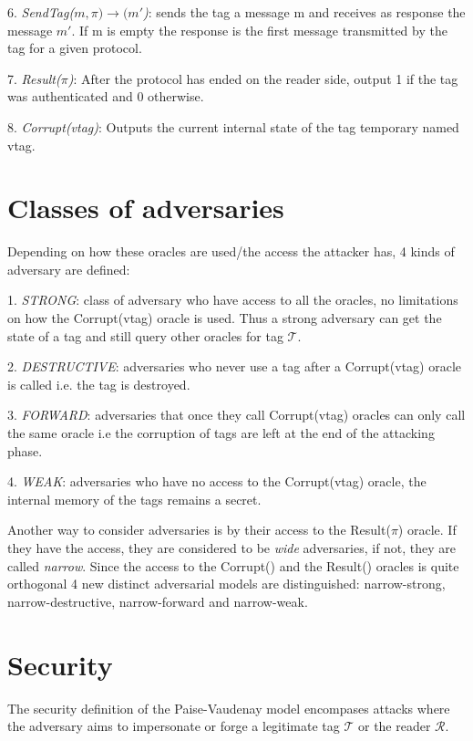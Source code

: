     6. \textit{SendTag($m, \pi) \rightarrow (m'$)}: sends the tag a message m and receives as response 
    the message $m'$. If m is empty the response is the first message transmitted by the tag for
    a given protocol. 

    7. \textit{Result($\pi$)}: After the protocol has ended on the reader side, output 1 if the tag was 
    authenticated and 0 otherwise.

    8. \textit{Corrupt(vtag)}: Outputs the current internal state of the tag temporary named vtag. 

    \section{Classes of adversaries}
    Depending on how these oracles are used/the access the attacker has, 4 kinds of adversary are defined:
    
    1. \textit{STRONG}: class of adversary who have access to all the oracles, no limitations on how the Corrupt(vtag) oracle
    is used. Thus a strong adversary can get the state of a tag and still query other oracles for tag $\mathcal{T}$.

    2. \textit{DESTRUCTIVE}: adversaries who never use a tag after a Corrupt(vtag) oracle is called
        i.e. the tag is destroyed.

    3. \textit{FORWARD}: adversaries that once they call Corrupt(vtag) oracles can only call the same oracle
        i.e the corruption of tags are left at the end of the attacking phase.

    4. \textit{WEAK}: adversaries who have no access to the Corrupt(vtag) oracle, the internal memory of the tags remains a secret. 

    Another way to consider adversaries is by their access to the Result($\pi$) oracle. If they have the access, they are considered to be
    \textit{wide} adversaries, if not, they are called \textit{narrow}. Since the access to the Corrupt() and the Result() oracles
    is quite orthogonal 4 new distinct adversarial models are distinguished: narrow-strong, narrow-destructive, narrow-forward and narrow-weak.

\section{Security}

    The security definition of the Paise-Vaudenay model \cite{PV model} encompases attacks where the adversary aims to impersonate or 
    forge a legitimate tag $\mathcal{T}$ or the reader $\mathcal{R}$.

